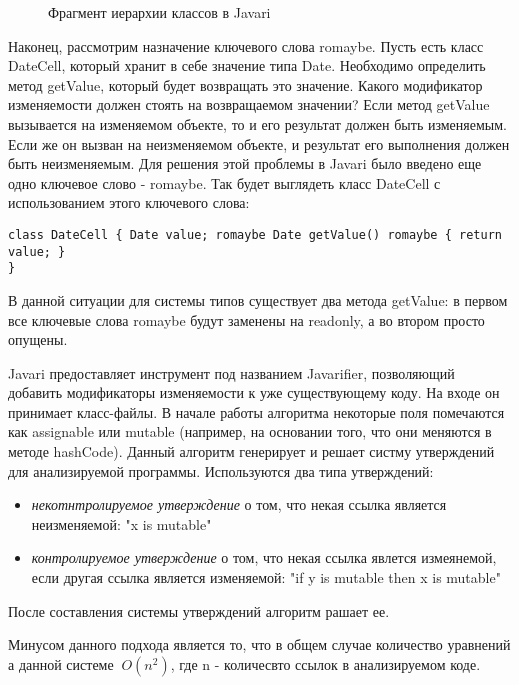 \begin{figure}[h]
\caption{Фрагмент иерархии классов в Javari}
\label{pic:javari_list_classes}
\end{figure}


Наконец, рассмотрим назначение ключевого слова romaybe. Пусть есть класс DateCell, который хранит в себе значение типа Date. Необходимо определить метод getValue, который будет возвращать это значение. Какого модификатор изменяемости должен стоять на возвращаемом значении? Если метод getValue вызывается на изменяемом объекте, то и его результат должен быть изменяемым. Если же он вызван на неизменяемом объекте, и результат его выполнения должен быть неизменяемым. Для решения этой проблемы в Javari было введено еще одно ключевое слово - romaybe. Так будет выглядеть класс DateCell с использованием этого ключевого слова:

\begin{lstlisting}[caption=Ключевое слово romaybe, label=code:javari_romaybe]
class DateCell { Date value; romaybe Date getValue() romaybe { return value; }
}
\end{lstlisting}

В данной ситуации для системы типов существует два метода getValue: в первом все ключевые слова romaybe будут заменены на readonly, а во втором просто опущены. 

Javari предоставляет инструмент под названием Javarifier, позволяющий добавить модификаторы изменяемости к уже существующему коду. На входе он принимает класс-файлы. В начале работы алгоритма некоторые поля помечаются как assignable или mutable (например, на основании того, что они меняются в методе hashCode). Данный алгоритм генерирует и решает систму утверждений для анализируемой программы. Используются два типа утверждений:
\begin{itemize}
	
	\item \textit{некотнтролируемое утверждение} о том, что некая ссылка является неизменяемой: "x is mutable"
	
	\item \textit{контролируемое утверждение} о том, что некая ссылка явлется измеянемой, если другая ссылка является изменяемой: "if y is mutable then x is mutable"
	
\end{itemize}
После составления системы утверждений алгоритм рашает ее.

Минусом данного подхода является то, что в общем случае количество уравнений а данной системе $~O(n^2)$, где n - количесвто ссылок в анализируемом коде. 

